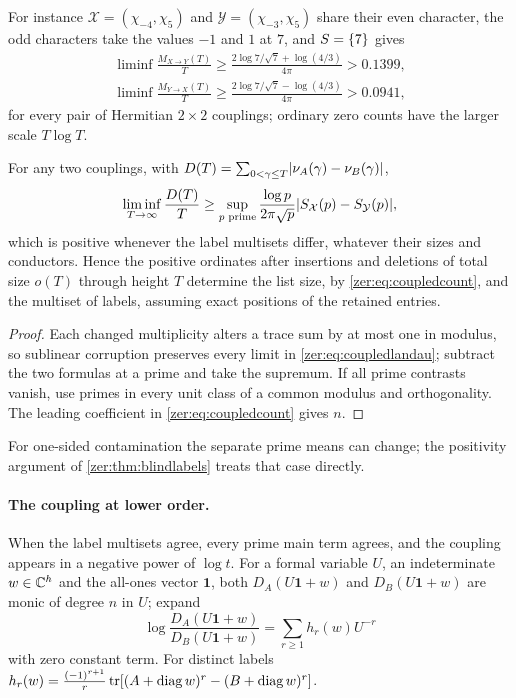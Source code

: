 For instance $\mathcal X=(\chi_{-4},\chi_5)$ and $\mathcal Y=(\chi_{-3},\chi_5)$ share their even character,
the odd characters take the values $-1$ and $1$ at $7$, and $S=\{7\}$ gives
\begin{gather*}
 \liminf\frac{M_{X\to Y}(T)}T\ge\frac{2\log7/\sqrt7+\log(4/3)}{4\pi}>0.1399,\\
 \liminf\frac{M_{Y\to X}(T)}T\ge\frac{2\log7/\sqrt7-\log(4/3)}{4\pi}>0.0941,
\end{gather*}
for every pair of Hermitian $2\times2$ couplings; ordinary zero counts have the larger scale $T\log T$.

\begin{corollary}\label{zer:cor:noise}
For any two couplings, with $D(T)=\sum_{0<\gamma\le T}\lvert\nu_A(\gamma)-\nu_B(\gamma)\rvert$,
\[
 \liminf_{T\to\infty}\frac{D(T)}T\ge\sup_{p\text{ prime}}\frac{\log p}{2\pi\sqrt p}\lvert S_{\mathcal X}(p)-S_{\mathcal Y}(p)\rvert,
\]
which is positive whenever the label multisets differ, whatever their sizes and conductors. Hence the
positive ordinates after insertions and deletions of total size $o(T)$ through height $T$ determine the
list size, by \eqref{zer:eq:coupledcount}, and the multiset of labels, assuming exact positions of the
retained entries.
\end{corollary}
\begin{proof}
Each changed multiplicity alters a trace sum by at most one in modulus, so sublinear corruption preserves
every limit in \eqref{zer:eq:coupledlandau}; subtract the two formulas at a prime and take the supremum.
If all prime contrasts vanish, use primes in every unit class of a common modulus and orthogonality. The
leading coefficient in \eqref{zer:eq:coupledcount} gives $n$.
\end{proof}

For one-sided contamination the separate prime means can change; the positivity argument of
\cref{zer:thm:blindlabels} treats that case directly.

\paragraph{The coupling at lower order.}
When the label multisets agree, every prime main term agrees, and the coupling appears in a negative
power of $\log t$. For a formal variable $U$, an indeterminate $w\in\mathbb{C}^h$ and the all-ones vector
$\mathbf 1$, both $D_A(U\mathbf 1+w)$ and $D_B(U\mathbf 1+w)$ are monic of degree $n$ in $U$; expand
\begin{equation}\label{zer:eq:couplinglog}
 \log\frac{D_A(U\mathbf 1+w)}{D_B(U\mathbf 1+w)}=\sum_{r\ge1}h_r(w)U^{-r}
\end{equation}
with zero constant term. For distinct labels
$h_r(w)=\tfrac{(-1)^{r+1}}r\operatorname{tr}[(A+\operatorname{diag} w)^r-(B+\operatorname{diag} w)^r]$.

